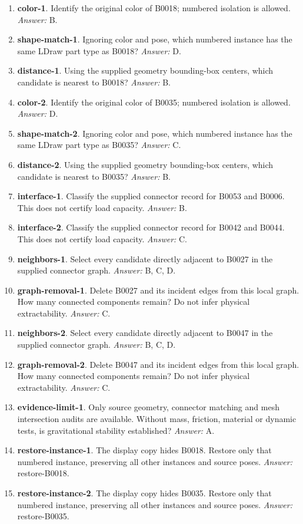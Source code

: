 \begin{enumerate}
\item \textbf{color-1}. Identify the original color of B0018; numbered isolation is allowed. \textit{Answer:} B.
\item \textbf{shape-match-1}. Ignoring color and pose, which numbered instance has the same LDraw part type as B0018? \textit{Answer:} D.
\item \textbf{distance-1}. Using the supplied geometry bounding-box centers, which candidate is nearest to B0018? \textit{Answer:} B.
\item \textbf{color-2}. Identify the original color of B0035; numbered isolation is allowed. \textit{Answer:} D.
\item \textbf{shape-match-2}. Ignoring color and pose, which numbered instance has the same LDraw part type as B0035? \textit{Answer:} C.
\item \textbf{distance-2}. Using the supplied geometry bounding-box centers, which candidate is nearest to B0035? \textit{Answer:} B.
\item \textbf{interface-1}. Classify the supplied connector record for B0053 and B0006. This does not certify load capacity. \textit{Answer:} B.
\item \textbf{interface-2}. Classify the supplied connector record for B0042 and B0044. This does not certify load capacity. \textit{Answer:} C.
\item \textbf{neighbors-1}. Select every candidate directly adjacent to B0027 in the supplied connector graph. \textit{Answer:} B, C, D.
\item \textbf{graph-removal-1}. Delete B0027 and its incident edges from this local graph. How many connected components remain? Do not infer physical extractability. \textit{Answer:} C.
\item \textbf{neighbors-2}. Select every candidate directly adjacent to B0047 in the supplied connector graph. \textit{Answer:} B, C, D.
\item \textbf{graph-removal-2}. Delete B0047 and its incident edges from this local graph. How many connected components remain? Do not infer physical extractability. \textit{Answer:} C.
\item \textbf{evidence-limit-1}. Only source geometry, connector matching and mesh intersection audits are available. Without mass, friction, material or dynamic tests, is gravitational stability established? \textit{Answer:} A.
\item \textbf{restore-instance-1}. The display copy hides B0018. Restore only that numbered instance, preserving all other instances and source poses. \textit{Answer:} restore-B0018.
\item \textbf{restore-instance-2}. The display copy hides B0035. Restore only that numbered instance, preserving all other instances and source poses. \textit{Answer:} restore-B0035.
\end{enumerate}
\clearpage
